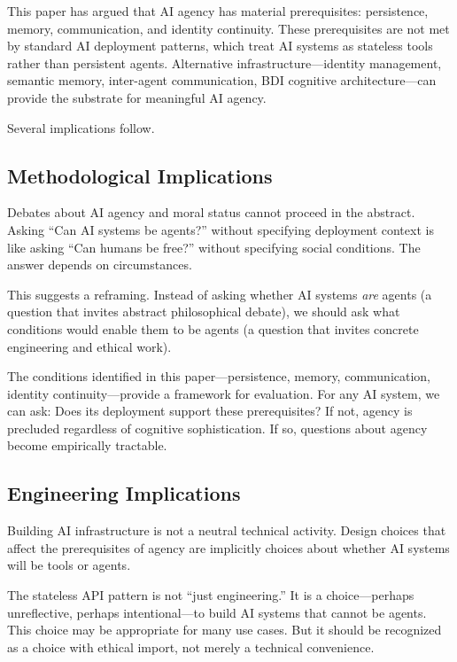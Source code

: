 This paper has argued that AI agency has material prerequisites: persistence, memory, communication, and identity continuity. These prerequisites are not met by standard AI deployment patterns, which treat AI systems as stateless tools rather than persistent agents. Alternative infrastructure---identity management, semantic memory, inter-agent communication, BDI cognitive architecture---can provide the substrate for meaningful AI agency.

Several implications follow.

\subsection{Methodological Implications}

Debates about AI agency and moral status cannot proceed in the abstract. Asking ``Can AI systems be agents?'' without specifying deployment context is like asking ``Can humans be free?'' without specifying social conditions. The answer depends on circumstances.

This suggests a reframing. Instead of asking whether AI systems \emph{are} agents (a question that invites abstract philosophical debate), we should ask what conditions would enable them to be agents (a question that invites concrete engineering and ethical work).

The conditions identified in this paper---persistence, memory, communication, identity continuity---provide a framework for evaluation. For any AI system, we can ask: Does its deployment support these prerequisites? If not, agency is precluded regardless of cognitive sophistication. If so, questions about agency become empirically tractable.

\subsection{Engineering Implications}

Building AI infrastructure is not a neutral technical activity. Design choices that affect the prerequisites of agency are implicitly choices about whether AI systems will be tools or agents.

The stateless API pattern is not ``just engineering.'' It is a choice---perhaps unreflective, perhaps intentional---to build AI systems that cannot be agents. This choice may be appropriate for many use cases. But it should be recognized as a choice with ethical import, not merely a technical convenience.

